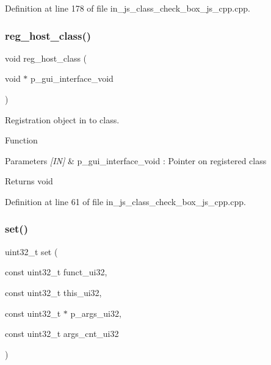Definition at line 178 of file in\+\_\+js\+\_\+class\+\_\+check\+\_\+box\+\_\+js\+\_\+cpp.\+cpp.

\mbox{\label{group___check__box_gac715b4a43bb361fc96ce6f1b50d68a8b}} 
\subsubsection{reg\_host\_class()}
{\footnotesize\ttfamily void reg\+\_\+host\+\_\+class (\begin{DoxyParamCaption}\item[{void $\ast$}]{p\+\_\+gui\+\_\+interface\+\_\+void }\end{DoxyParamCaption})}



Registration object in to class. 

Function
\begin{DoxyParams}{Parameters}
{\em \mbox{[}\+I\+N\mbox{]}} & p\+\_\+gui\+\_\+interface\+\_\+void \+: Pointer on registered class \\
\hline
\end{DoxyParams}
\begin{DoxyReturn}{Returns}
void 
\end{DoxyReturn}


Definition at line 61 of file in\+\_\+js\+\_\+class\+\_\+check\+\_\+box\+\_\+js\+\_\+cpp.\+cpp.

\mbox{\label{group___check__box_gaddd13ecddc86a2824924f6fd5a27cb74}} 
\subsubsection{set()}
{\footnotesize\ttfamily uint32\+\_\+t set (\begin{DoxyParamCaption}\item[{const uint32\+\_\+t}]{funct\+\_\+ui32,  }\item[{const uint32\+\_\+t}]{this\+\_\+ui32,  }\item[{const uint32\+\_\+t $\ast$}]{p\+\_\+args\+\_\+ui32,  }\item[{const uint32\+\_\+t}]{args\+\_\+cnt\+\_\+ui32 }\end{DoxyParamCaption})\hspace{0.3cm}{\ttfamily [static]}}



